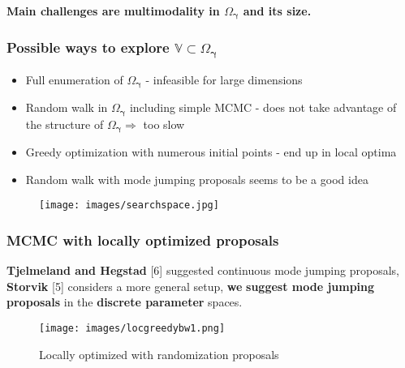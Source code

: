 \documentclass{beamer}
\newcommand{\jwidth}{\righthyphenmin=20 \justifying}
\begin{document}
\begin{frame}
\textbf{Main challenges are multimodality in $\Omega_{\boldsymbol{\gamma}}$ and its size.}
\frametitle{Possible ways to explore $\mathbb{V} \subset \Omega_{\boldsymbol{\gamma}}$}
\begin{itemize}
\item \jwidth Full enumeration of $\Omega_{\boldsymbol{\gamma}}$ - infeasible for large dimensions
\item \jwidth Random walk in $\Omega_{\boldsymbol{\gamma}}$ including simple MCMC - does not take advantage of the structure of $\Omega_{\boldsymbol{\gamma}}\Longrightarrow$ too slow 
\item \jwidth Greedy optimization with numerous initial points - end up in local optima
\item \jwidth Random walk with mode jumping proposals seems to be a good idea
\end{itemize}
\begin{figure}
\texttt{[image: images/searchspace.jpg]}
\end{figure}


\end{frame}

\begin{frame}

\frametitle{MCMC with locally optimized proposals}
\textbf{Tjelmeland and  Hegstad} \color{blue}[6] \color{black}    suggested continuous mode jumping proposals, \textbf{Storvik} \color{blue}[5] \color{black} considers a more general setup, \textbf{we} \textbf{suggest mode jumping proposals} in the \textbf{discrete parameter} spaces.
\begin{figure}
\texttt{[image: images/locgreedybw1.png]}
\caption{Locally optimized with randomization proposals}
\end{figure}
\end{frame}
\end{document}
